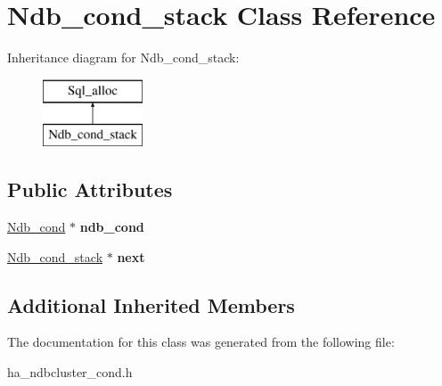 \hypertarget{classNdb__cond__stack}{}\section{Ndb\+\_\+cond\+\_\+stack Class Reference}
\label{classNdb__cond__stack}
Inheritance diagram for Ndb\+\_\+cond\+\_\+stack\+:\begin{figure}[H]
\begin{center}
\leavevmode
\includegraphics[height=2.000000cm]{classNdb__cond__stack}
\end{center}
\end{figure}
\subsection*{Public Attributes}
\begin{DoxyCompactItemize}
\item 
\mbox{\label{classNdb__cond__stack_a44fd36c0bae5144e2ac08989eccbff79}} 
\mbox{\hyperlink{classNdb__cond}{Ndb\+\_\+cond}} $\ast$ {\bfseries ndb\+\_\+cond}
\item 
\mbox{\label{classNdb__cond__stack_a6069472b7a54388b5524b99c2605d26d}} 
\mbox{\hyperlink{classNdb__cond__stack}{Ndb\+\_\+cond\+\_\+stack}} $\ast$ {\bfseries next}
\end{DoxyCompactItemize}
\subsection*{Additional Inherited Members}


The documentation for this class was generated from the following file\+:\begin{DoxyCompactItemize}
\item 
ha\+\_\+ndbcluster\+\_\+cond.\+h\end{DoxyCompactItemize}
